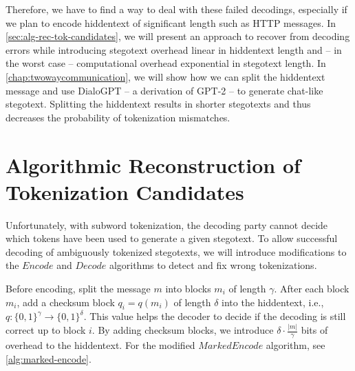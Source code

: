 
Therefore, we have to find a way to deal with these failed decodings, especially if we plan to encode hiddentext of significant length such as HTTP messages.
In \autoref{sec:alg-rec-tok-candidates}, we will present an approach to recover from decoding errors while introducing stegotext overhead linear in hiddentext length and -- in the worst case -- computational overhead exponential in stegotext length.
In \autoref{chap:twowaycommunication}, we will show how we can split the hiddentext message and use DialoGPT -- a derivation of GPT-2 -- to generate chat-like stegotext.
Splitting the hiddentext results in shorter stegotexts and thus decreases the probability of tokenization mismatches.



\section{Algorithmic Reconstruction of Tokenization Candidates}
\label{sec:alg-rec-tok-candidates}

Unfortunately, with subword tokenization, the decoding party cannot decide which tokens have been used to generate a given stegotext.
To allow successful decoding of ambiguously tokenized stegotexts, we will introduce modifications to the $Encode$ and $Decode$ algorithms to detect and fix wrong tokenizations.

Before encoding, split the message $m$ into blocks $m_i$ of length $\gamma$.
After each block $m_i$, add a checksum block $q_i = q(m_i)$ of length $\delta$ into the hiddentext, i.e., $q \colon \{ 0,1 \}^\gamma \rightarrow \{ 0,1 \}^\delta$.
This value helps the decoder to decide if the decoding is still correct up to block $i$.
By adding checksum blocks, we introduce $\delta \cdot \frac{|m|}{\gamma}$ bits of overhead to the hiddentext.
For the modified $MarkedEncode$ algorithm, see \autoref{alg:marked-encode}.

